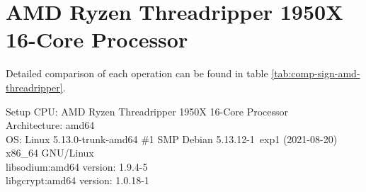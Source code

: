 \section{AMD Ryzen Threadripper 1950X 16-Core Processor}
Detailed comparison of each operation can be found in table \ref{tab:comp-sign-amd-threadripper}.
\begin{bfhBox}{Setup}
	CPU: AMD Ryzen Threadripper 1950X 16-Core Processor \\
    Architecture: amd64 \\
    OS: Linux 5.13.0-trunk-amd64 \#1 SMP Debian 5.13.12-1~exp1
    (2021-08-20) x86\_64 GNU/Linux \\
    libsodium:amd64 version: 1.9.4-5 \\ 
    libgcrypt:amd64 version: 1.0.18-1 
\end{bfhBox}

